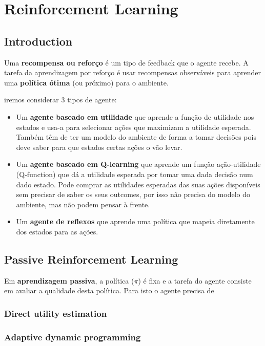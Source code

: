 \documentclass[11pt]{article}
\begin{document}
\newpage
\setcounter{section}{20}
\section{Reinforcement Learning}

\subsection{Introduction}

Uma \textbf{recompensa ou reforço} é um tipo de feedback que o agente recebe. A tarefa da aprendizagem por reforço é usar recompensas observáveis para aprender uma \textbf{política ótima} (ou próximo) para o ambiente.\vspace{4pt}

iremos considerar 3 tipos de agente:
\begin{itemize}
    \item Um \textbf{agente baseado em utilidade} que aprende a função de utilidade nos estados e usa-a para selecionar ações que maximizam a utilidade esperada. Também têm de ter um modelo do ambiente de forma a tomar decisões pois deve saber para que estados certas ações o vão levar.
    \item Um \textbf{agente baseado em Q-learning} que aprende um função ação-utilidade (Q-function) que dá a utilidade esperada por tomar uma dada decisão num dado estado. Pode comprar as utilidades esperadas das suas ações disponíveis sem precisar de saber os seus outcomes, por isso não precisa do modelo do ambiente, mas não podem pensar à frente.
    \item Um \textbf{agente de reflexos} que aprende uma política que mapeia diretamente dos estados para as ações.
\end{itemize}

\subsection{Passive Reinforcement Learning}

Em \textbf{aprendizagem passiva}, a política ($\pi$) é fixa e a tarefa do agente consiste em avaliar a qualidade desta política. Para isto o agente precisa de 

\subsubsection{Direct utility estimation}

\subsubsection{Adaptive dynamic programming}
\end{document}
